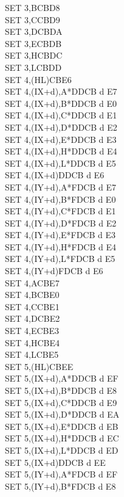 \documentclass[oneside,a4paper]{book}
\begin{document}
\begin{multicols}{3}
{\begin{tabbing}
SET 3,B\>CBD8\\
SET 3,C\>CBD9\\
SET 3,D\>CBDA\\
SET 3,E\>CBDB\\
SET 3,H\>CBDC\\
SET 3,L\>CBDD\\
SET 4,(HL)\>CBE6\\
SET 4,(IX+d),A*\>DDCB d E7\\
SET 4,(IX+d),B*\>DDCB d E0\\
SET 4,(IX+d),C*\>DDCB d E1\\
SET 4,(IX+d),D*\>DDCB d E2\\
SET 4,(IX+d),E*\>DDCB d E3\\
SET 4,(IX+d),H*\>DDCB d E4\\
SET 4,(IX+d),L*\>DDCB d E5\\
SET 4,(IX+d)\>DDCB d E6\\
SET 4,(IY+d),A*\>FDCB d E7\\
SET 4,(IY+d),B*\>FDCB d E0\\
SET 4,(IY+d),C*\>FDCB d E1\\
SET 4,(IY+d),D*\>FDCB d E2\\
SET 4,(IY+d),E*\>FDCB d E3\\
SET 4,(IY+d),H*\>FDCB d E4\\
SET 4,(IY+d),L*\>FDCB d E5\\
SET 4,(IY+d)\>FDCB d E6\\
SET 4,A\>CBE7\\
SET 4,B\>CBE0\\
SET 4,C\>CBE1\\
SET 4,D\>CBE2\\
SET 4,E\>CBE3\\
SET 4,H\>CBE4\\
SET 4,L\>CBE5\\
SET 5,(HL)\>CBEE\\
SET 5,(IX+d),A*\>DDCB d EF\\
SET 5,(IX+d),B*\>DDCB d E8\\
SET 5,(IX+d),C*\>DDCB d E9\\
SET 5,(IX+d),D*\>DDCB d EA\\
SET 5,(IX+d),E*\>DDCB d EB\\
SET 5,(IX+d),H*\>DDCB d EC\\
SET 5,(IX+d),L*\>DDCB d ED\\
SET 5,(IX+d)\>DDCB d EE\\
SET 5,(IY+d),A*\>FDCB d EF\\
SET 5,(IY+d),B*\>FDCB d E8\\

\end{tabbing}}
\end{multicols}
\end{document}
